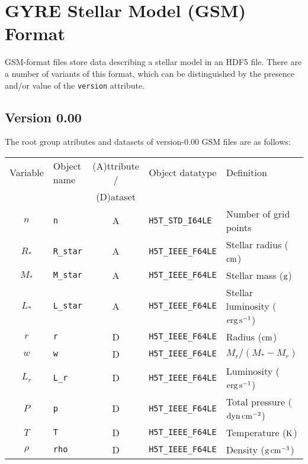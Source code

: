 \documentclass{article}
\newcommand{\Rstar}{\ensuremath{R_{\ast}}}
\newcommand{\Mstar}{\ensuremath{M_{\ast}}}
\newcommand{\Lstar}{\ensuremath{L_{\ast}}}
\newcommand{\cm}{\ensuremath{{\rm cm}}}
\newcommand{\gram}{\ensuremath{{\rm g}}}
\newcommand{\second}{\ensuremath{{\rm s}}}
\newcommand{\dyne}{\ensuremath{{\rm dyn}}}
\newcommand{\erg}{\ensuremath{{\rm erg}}}
\newcommand{\kelvin}{\ensuremath{{\rm K}}}
\begin{document}
\section*{GYRE Stellar Model (GSM) Format}

GSM-format files store data describing a stellar model in an HDF5
file. There are a number of variants of this format, which can be
distinguished by the presence and/or value of the \texttt{version}
attribute.

\subsection*{Version 0.00}

The root group atributes and datasets of version-0.00 GSM files are as follows:

\begin{table}[h!]
\begin{tabular}{|c|l|c|l|l|} \hline
Variable & Object name & (A)ttribute / & Object datatype & Definition \\
         &             & (D)ataset     &                 &            \\ \hline
$n$               & \texttt{n}            & A &\texttt{H5T\_STD\_I64LE}  & Number of grid points \\ 
\Rstar            & \texttt{R\_star}      & A & \texttt{H5T\_IEEE\_F64LE} & Stellar radius ($\cm$) \\
\Mstar            & \texttt{M\_star}      & A & \texttt{H5T\_IEEE\_F64LE} & Stellar mass ($\gram$) \\
\Lstar            & \texttt{L\_star}      & A & \texttt{H5T\_IEEE\_F64LE} & Stellar luminosity ($\erg\,\second^{-1}$) \\
$r$               & \texttt{r}            & D & \texttt{H5T\_IEEE\_F64LE} & Radius ($\cm$) \\
$w$               & \texttt{w}            & D & \texttt{H5T\_IEEE\_F64LE} & $M_{r}/(\Mstar-M_{r})$ \\
$L_{r}$           & \texttt{L\_r}         & D & \texttt{H5T\_IEEE\_F64LE} & Luminosity ($\erg\,\second^{-1}$) \\
$P$               & \texttt{p}            & D & \texttt{H5T\_IEEE\_F64LE} & Total pressure ($\dyne\,\cm^{-2}$) \\
$T$               & \texttt{T}            & D & \texttt{H5T\_IEEE\_F64LE} & Temperature ($\kelvin$) \\
$\rho$            & \texttt{rho}          & D & \texttt{H5T\_IEEE\_F64LE} & Density ($\gram\,\cm^{-3}$) \\

\end{tabular}
\end{table}
\end{document}
